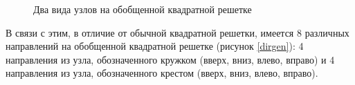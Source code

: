 \documentclass[utf8,12pt]{jetp}
\begin{document}
\begin{figure}[h]
	\begin{minipage}[h]{0.4\linewidth}
	\end{minipage}
	\hfill
	\begin{minipage}[h]{0.4\linewidth}
	\end{minipage}
	\caption{Два вида узлов на обобщенной квадратной решетке }
	\label{point}
\end{figure}

В связи с этим, в отличие от обычной квадратной решетки, имеется 8 различных направлений на обобщенной квадратной решетке (рисунок \ref{dirgen}): 4 направления из узла, обозначенного кружком (вверх, вниз, влево, вправо) и 4 направления из узла, обозначенного крестом (вверх, вниз, влево, вправо).
\end{document}
